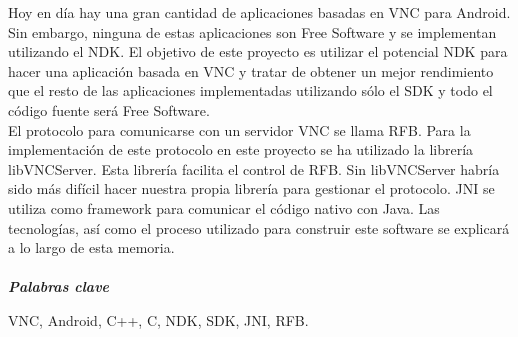 
Hoy en día hay una gran cantidad de aplicaciones basadas en VNC para Android. Sin embargo, ninguna de estas aplicaciones son Free Software y se implementan utilizando el NDK. El objetivo de este proyecto es utilizar el potencial NDK para hacer una aplicación basada en VNC y tratar de obtener un mejor rendimiento que el resto de las aplicaciones implementadas utilizando sólo el SDK y todo el código fuente será Free Software.\\

El protocolo para comunicarse con un servidor VNC se llama RFB. Para la implementación de este protocolo en este proyecto se ha utilizado la librería libVNCServer. Esta librería facilita el control de RFB. Sin libVNCServer habría sido más difícil hacer nuestra propia librería para gestionar el protocolo. JNI se utiliza como framework para comunicar el código nativo con Java. Las tecnologías, así como el proceso utilizado para construir este software se explicará a lo largo de esta memoria. 
\\ \mbox{ } \\
\textit{\textbf{Palabras clave}}

VNC, Android, C++, C, NDK, SDK, JNI, RFB.
